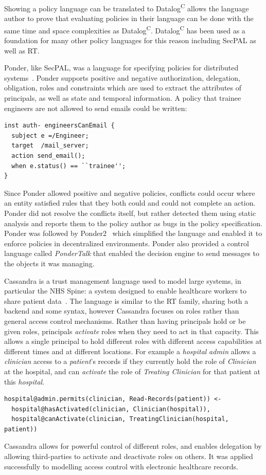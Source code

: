 \documentclass[thesis.tex]{subfiles}
\begin{document}
Showing a policy language can be translated to Datalog\textsuperscript{C} allows the language author 
to prove that evaluating policies in their language can be done with the same time and space complexities as Datalog\textsuperscript{C}.
Datalog\textsuperscript{C} has been used as a foundation for many
other policy languages for this reason including SecPAL as well as RT.  

Ponder, like SecPAL, was a language for specifying policies for distributed
systems~\cite{damianou_ponder_2001}. Ponder supports positive and negative
authorization, delegation, obligation, roles and constraints which are used to
extract the attributes of principals, as well as state and temporal information.
A policy that trainee engineers are not allowed to send emails could be written:

\begin{lstlisting}
inst auth- engineersCanEmail {
  subject e =/Engineer;
  target  /mail_server;
  action send_email();
  when e.status() == ``trainee'';
}
\end{lstlisting}

Since Ponder allowed positive and negative policies, conflicts could occur where
an entity satisfied rules that they both could and could not complete an action.
Ponder did not resolve the conflicts itself, but rather detected them using
static analysis and reports them to the policy author as bugs in the policy
specification. Ponder was followed by Ponder2~\cite{twidle_ponder2:_2009} which
simplified the language and enabled it to enforce policies in decentralized
environments. Ponder also provided a control language called \emph{PonderTalk}
that enabled the decision engine to send messages to the objects it was
managing.

Cassandra is a trust management language used to model large systems,
in particular the NHS Spine: a system designed to enable healthcare
workers to share patient
data~\cite{becker_cassandra:_2004,becker_cassandra:_2004-1}.  The
language is similar to the RT family, sharing both a backend and some
syntax, however Cassandra focuses on roles rather than general access
control mechanisms.  Rather than having principals hold or be given
roles, principals \emph{activate} roles when they need to act in that
capacity.  This allows a single principal to hold different roles with
different access capabilities at different times and at different
locations.  For example a \emph{hospital} \emph{admin} allows a
\emph{clinician} access to a \emph{patient}'s records if they
currently hold the role of \emph{Clinician} at the hospital, and can
\emph{activate} the role of \emph{Treating Clinician} for that patient
at this \emph{hospital}.

\begin{lstlisting}
hospital@admin.permits(clinician, Read-Records(patient)) <-
  hospital@hasActivated(clinician, Clinician(hospital)),
  hospital@canActivate(clinician, TreatingClinician(hospital, patient))
\end{lstlisting}

Cassandra allows for powerful control of different roles, and enables
delegation by allowing third-parties to activate and deactivate roles
on others.  It was applied successfully to modelling access control
with electronic healthcare records.
\end{document}
